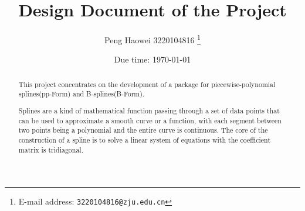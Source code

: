 \usepackage[lined, ruled]{algorithm2e}
\usepackage{listings}
\setlength{\topmargin}{-1cm}
\setlength{\paperheight}{29.7cm}
\setlength{\textheight}{25.3cm}



\renewcommand\arraystretch{1.2}

%


\title{\textbf{Design Document of the Project}}

\author{Peng Haowei 3220104816
  \thanks{E-mail address: \texttt{3220104816@zju.edu.cn}}}

\date{Due time: \today}

\maketitle

\begin{abstract}
  This project concentrates on the development of a package for piecewise-polynomial splines(pp-Form) and B-splines(B-Form). 

  Splines are a kind of mathematical function passing through a set of data points that can be used to approximate a smooth curve or a function, with each segment between two points being a polynomial and the entire curve is continuous. 
  The core of the construction of a spline is to solve a linear system of equations with the coefficient matrix is tridiagonal. 
  \end{abstract}

